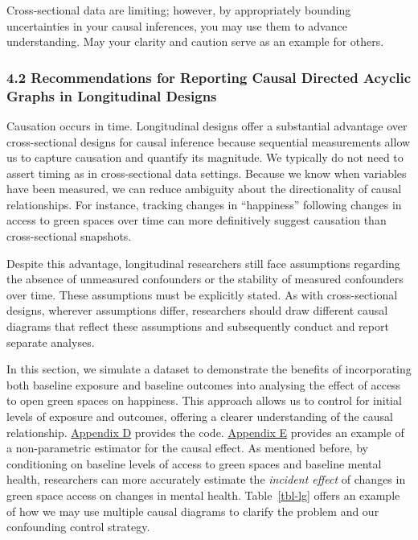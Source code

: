 \documentclass[
  single column]{article}
\begin{document}
Cross-sectional data are limiting; however, by appropriately bounding
uncertainties in your causal inferences, you may use them to advance
understanding. May your clarity and caution serve as an example for
others.

\subsubsection{4.2 Recommendations for Reporting Causal Directed Acyclic
Graphs in Longitudinal
Designs}\label{recommendations-for-reporting-causal-directed-acyclic-graphs-in-longitudinal-designs}

Causation occurs in time. Longitudinal designs offer a substantial
advantage over cross-sectional designs for causal inference because
sequential measurements allow us to capture causation and quantify its
magnitude. We typically do not need to assert timing as in
cross-sectional data settings. Because we know when variables have been
measured, we can reduce ambiguity about the directionality of causal
relationships. For instance, tracking changes in ``happiness'' following
changes in access to green spaces over time can more definitively
suggest causation than cross-sectional snapshots.

Despite this advantage, longitudinal researchers still face assumptions
regarding the absence of unmeasured confounders or the stability of
measured confounders over time. These assumptions must be explicitly
stated. As with cross-sectional designs, wherever assumptions differ,
researchers should draw different causal diagrams that reflect these
assumptions and subsequently conduct and report separate analyses.

In this section, we simulate a dataset to demonstrate the benefits of
incorporating both baseline exposure and baseline outcomes into
analysing the effect of access to open green spaces on happiness. This
approach allows us to control for initial levels of exposure and
outcomes, offering a clearer understanding of the causal relationship.
\hyperref[appendix-d-simulation-of-different-confounding-control-strategies]{Appendix
D} provides the code.
\hyperref[appendix-e-non-parametric-estimation-of-average-treatment-effects-using-causal-forests]{Appendix
E} provides an example of a non-parametric estimator for the causal
effect. As mentioned before, by conditioning on baseline levels of
access to green spaces and baseline mental health, researchers can more
accurately estimate the \emph{incident effect} of changes in green space
access on changes in mental health. Table~\ref{tbl-lg} offers an example
of how we may use multiple causal diagrams to clarify the problem and
our confounding control strategy.
\end{document}
